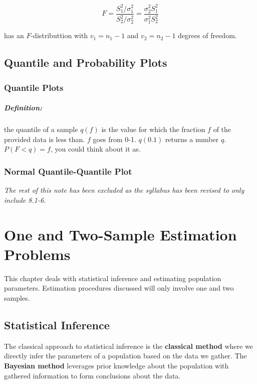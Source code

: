 \documentclass[a4paper,12pt]{report}
\begin{document}
$$F = \frac{S_1^2/\sigma_1^2}{S_2^2 / \sigma_2^2} = \frac{\sigma_2^2 S_1^2}{\sigma_1^2 S_2^2}$$

has an $F$-distributtion with $v_1 = n_1 - 1$ and $v_2 = n_2 - 1$ degrees of freedom. 



\section{Quantile and Probability Plots}

\subsection{Quantile Plots}

\paragraph{Definition: } the quantile of a sample $q(f)$ is the value for which the fraction $f$ of the provided data is less than. $f$ goes from 0-1. $q(0.1)$ returns a number $q$. $P(F < q) = f$, you could think about it as. 

\subsection{Normal Quantile-Quantile Plot}

\textit{The rest of this note has been excluded as the syllabus has been revised to only include 8.1-6.}


\chapter{One and Two-Sample Estimation Problems}

This chapter deals with statistical inference and estimating population parameters. Estimation procedures discussed will only involve one and two samples. 

\section{Statistical Inference}

The classical approach to statistical inference is the \textbf{classical method} where we directly infer the parameters of a population based on the data we gather. The \textbf{Bayesian method} leverages prior knowledge about the population with gathered information to form conclusions about the data. 
\end{document}
